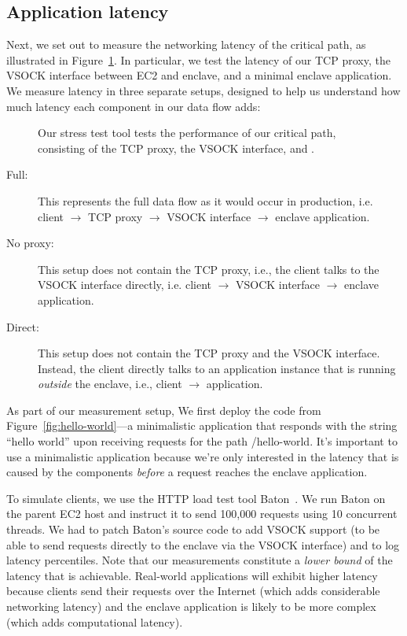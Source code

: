 \subsection{Application latency}
\label{sec:latency}

Next, we set out to measure the networking latency of the critical path, as
illustrated in Figure~\ref{fig:stress-test}.  In particular, we test the
latency of our TCP proxy, the VSOCK interface between EC2 and enclave, and a
minimal enclave application.
%
We measure latency in three separate setups, designed to help us understand how
much latency each component in our data flow adds:

\begin{figure}[t]
    \centering
    
    \caption{Our stress test tool tests the performance of our critical path,
    consisting of the TCP proxy, the VSOCK interface, and \tool{}.}
    \label{fig:stress-test}
\end{figure}

\begin{description}
  \item[Full:] This represents the full data flow as it would occur in
    production, i.e. client $\rightarrow$ TCP proxy $\rightarrow$ VSOCK
    interface $\rightarrow$ enclave application.

  \item[No proxy:] This setup does not contain the TCP proxy, i.e., the client
    talks to the VSOCK interface directly, i.e. client $\rightarrow$ VSOCK
    interface $\rightarrow$ enclave application.

  \item[Direct:] This setup does not contain the TCP proxy and the VSOCK
    interface.  Instead, the client directly talks to an application instance that is
    running \emph{outside} the enclave, i.e., client $\rightarrow$ application.
\end{description}

As part of our measurement setup, We first deploy the code from
Figure~\ref{fig:hello-world}---a minimalistic application that responds with
the string ``hello world'' upon receiving requests for the path /hello-world.
It's important to use a minimalistic application because we're only interested
in the latency that is caused by the components \emph{before} a request reaches
the enclave application.

To simulate clients, we use the HTTP load test tool Baton~\cite{baton}.  We run
Baton on the parent EC2 host and instruct it to send 100,000 requests using 10
concurrent threads.  We had to patch Baton's source code to add VSOCK support
(to be able to send requests directly to the enclave via the VSOCK interface)
and to log latency percentiles.  Note that our measurements constitute a
\emph{lower bound} of the latency that is achievable.  Real-world applications
will exhibit higher latency because clients send their requests over the
Internet (which adds considerable networking latency) and the enclave
application is likely to be more complex (which adds computational latency).

